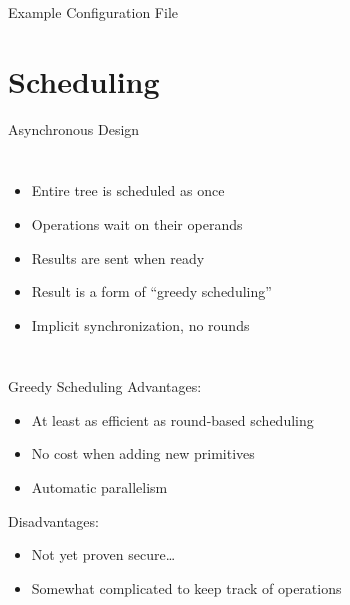 \documentclass[t,noamsthm]{beamer}
\begin{document}
\begin{frame}{Example Configuration File}


  

\end{frame}

\section{Scheduling}

\begin{frame}{Asynchronous Design}

  \begin{columns}




    \begin{itemize}
    \item Entire tree is scheduled as once
    \item Operations wait on their operands
    \item Results are sent when ready
    \item Result is a form of ``greedy scheduling''
    \item Implicit synchronization, no rounds
    \end{itemize}

  \end{columns}

\end{frame}

\begin{frame}{Greedy Scheduling}
  Advantages:
  \begin{itemize}
  \item At least as efficient as round-based scheduling
  \item No cost when adding new primitives
  \item Automatic parallelism
  \end{itemize}

  Disadvantages:
  \begin{itemize}
  \item Not yet proven secure\dots
  \item Somewhat complicated to keep track of operations
  \end{itemize}
\end{frame}
\end{document}

